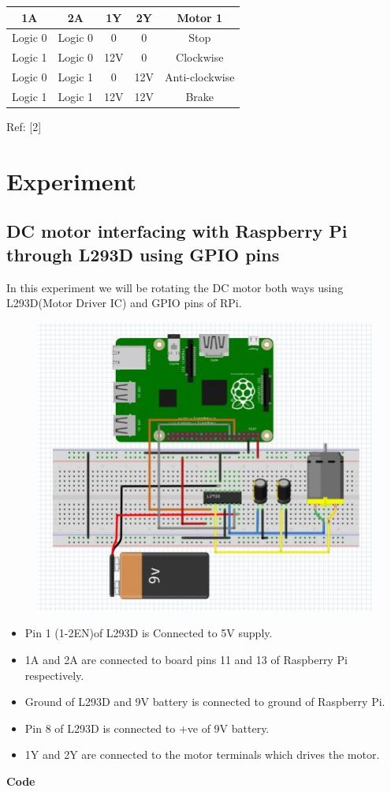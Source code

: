 \documentclass[11pt,a4paper]{article}
\begin{document}
    \vspace{0.5cm}
    \centering
    \begin{tabular}{|c|c|c|c|c|}
    	\hline
    	1A & 2A	& 1Y & 2Y & Motor 1\\
    	\hline
    	Logic 0	& Logic 0 & 0 & 0 & Stop \\
    	\hline
    	Logic 1	& Logic 0 & 12V	& 0	& Clockwise\\
    	\hline
    	Logic 0	& Logic 1 & 0 & 12V	& Anti-clockwise\\
    	\hline
    	Logic 1	& Logic 1 & 12V & 12V & Brake\\
    	\hline
    \end{tabular}
    \newline
    Ref: [2]
    
    \newpage
    \flushleft 
	\section{Experiment}
	\subsection{ DC motor interfacing with Raspberry Pi through L293D using GPIO pins}
	In this experiment we will be rotating the DC motor both ways using L293D(Motor Driver IC) and GPIO pins of RPi.
	\begin{figure}[h!]
		\includegraphics[scale=0.6]{DC_motor_GPIO.jpg}
		\centering
	\end{figure} 
	\begin{itemize}
		\item  Pin 1 (1-2EN)of L293D is Connected to 5V supply.
		\item  1A and 2A are connected to board pins 11 and 13 of Raspberry Pi respectively.
		\item  Ground of L293D and 9V battery is connected to ground of Raspberry Pi.
		\item  Pin 8 of L293D is connected to +ve of 9V battery.
		\item  1Y and 2Y are connected to the motor terminals which drives the motor.
	\end{itemize}
	\newpage 
	\textbf{Code}
	\vspace{0.3cm}
	
	
\end{document}
